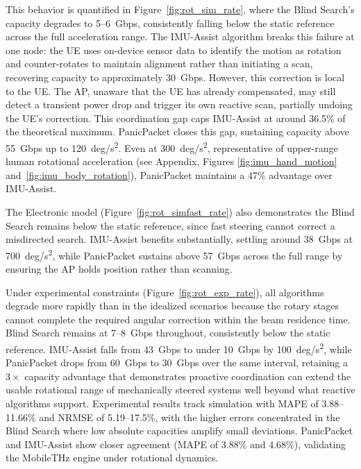 \documentclass[fleqn,10pt]{wlscirep}
\begin{document}
This behavior is quantified in Figure~\ref{fig:rot_sim_rate}, where the Blind Search's capacity degrades to \SI{5}{}--\SI{6}{Gbps}, consistently falling below the static reference across the full acceleration range. The IMU-Assist algorithm breaks this failure at one node: the UE uses on-device sensor data to identify the motion as rotation and counter-rotates to maintain alignment rather than initiating a scan, recovering capacity to approximately \SI{30}{Gbps}. However, this correction is local to the UE. The AP, unaware that the UE has already compensated, may still detect a transient power drop and trigger its own reactive scan, partially undoing the UE's correction. This coordination gap caps IMU-Assist at around 36.5\% of the theoretical maximum. PanicPacket closes this gap, sustaining capacity above \SI{55}{Gbps} up to \SI{120}{deg/s^2}. Even at \SI{300}{deg/s^2}, representative of upper-range human rotational acceleration (see Appendix, Figures \ref{fig:imu_hand_motion} and~\ref{fig:imu_body_rotation}), PanicPacket maintains a 47\% advantage over IMU-Assist.

The Electronic model (Figure~\ref{fig:rot_simfast_rate}) also demonstrates the Blind Search remains below the static reference, since fast steering cannot correct a misdirected search. IMU-Assist benefits substantially, settling around \SI{38}{Gbps} at \SI{700}{deg/s^2}, while PanicPacket sustains above \SI{57}{Gbps} across the full range by ensuring the AP holds position rather than scanning.

Under experimental constraints (Figure~\ref{fig:rot_exp_rate}), all algorithms degrade more rapidly than in the idealized scenarios because the rotary stages cannot complete the required angular correction within the beam residence time. Blind Search remains at \SI{7}{}--\SI{8}{Gbps} throughout, consistently below the static reference. IMU-Assist falls from \SI{43}{Gbps} to under \SI{10}{Gbps} by \SI{100}{deg/s^2}, while PanicPacket drops from \SI{60}{Gbps} to \SI{30}{Gbps} over the same interval, retaining a $3\times$ capacity advantage that demonstrates proactive coordination can extend the usable rotational range of mechanically steered systems well beyond what reactive algorithms support. Experimental results track simulation with MAPE of 3.88--11.66\% and NRMSE of 5.19--17.5\%, with the higher errors concentrated in the Blind Search where low absolute capacities amplify small deviations. PanicPacket and IMU-Assist show closer agreement (MAPE of 3.88\% and 4.68\%), validating the MobileTHz engine under rotational dynamics.
\end{document}

